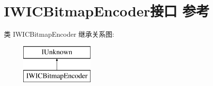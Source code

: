 \hypertarget{interface_i_w_i_c_bitmap_encoder}{}\section{I\+W\+I\+C\+Bitmap\+Encoder接口 参考}
\label{interface_i_w_i_c_bitmap_encoder}
类 I\+W\+I\+C\+Bitmap\+Encoder 继承关系图\+:\begin{figure}[H]
\begin{center}
\leavevmode
\includegraphics[height=2.000000cm]{interface_i_w_i_c_bitmap_encoder}
\end{center}
\end{figure}
